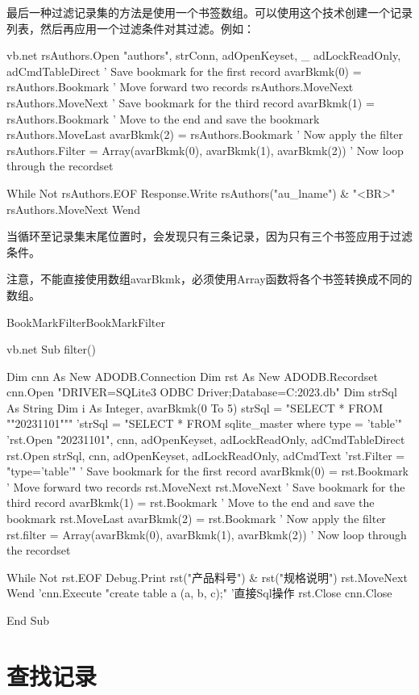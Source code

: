 最后一种过滤记录集的方法是使用一个书签数组。可以使用这个技术创建一个记录列表，然后再应用一个过滤条件对其过滤。例如：
\begin{amzcode}{vb.net}
rsAuthors.Open "authors", strConn, adOpenKeyset, _
                     adLockReadOnly, adCmdTableDirect
' Save bookmark for the first record
avarBkmk(0) = rsAuthors.Bookmark
' Move forward two records
rsAuthors.MoveNext
rsAuthors.MoveNext
' Save bookmark for the third record
avarBkmk(1) = rsAuthors.Bookmark
' Move to the end and save the bookmark
rsAuthors.MoveLast
avarBkmk(2) = rsAuthors.Bookmark
' Now apply the filter
rsAuthors.Filter = Array(avarBkmk(0), avarBkmk(1), avarBkmk(2))
' Now loop through the recordset

While Not rsAuthors.EOF
       Response.Write rsAuthors("au_lname") & "{\textless}BR{\textgreater}"
       rsAuthors.MoveNext
Wend
\end{amzcode}
当循环至记录集末尾位置时，会发现只有三条记录，因为只有三个书签应用于过滤条件。

注意，不能直接使用数组avarBkmk，必须使用Array函数将各个书签转换成不同的数组。
\begin{codebox}{BookMarkFilter}{BookMarkFilter}
	\begin{amzcode}{vb.net}
	Sub filter()
	
	Dim cnn As New ADODB.Connection
	Dim rst As New ADODB.Recordset
	cnn.Open "DRIVER={SQLite3 ODBC Driver};Database=C:\Users\Administrator\Desktop\tmp\fee2023.db"
	Dim strSql As String
	Dim i As Integer, avarBkmk(0 To 5)
	strSql = "SELECT * FROM ""20231101"""
	'strSql = "SELECT * FROM sqlite_master where type = 'table'"
	'rst.Open "20231101", cnn, adOpenKeyset, adLockReadOnly, adCmdTableDirect
	rst.Open strSql, cnn, adOpenKeyset, adLockReadOnly, adCmdText
	'rst.Filter = "type='table'"
	' Save bookmark for the first record
	avarBkmk(0) = rst.Bookmark
	' Move forward two records
	rst.MoveNext
	rst.MoveNext
	' Save bookmark for the third record
	avarBkmk(1) = rst.Bookmark
	' Move to the end and save the bookmark
	rst.MoveLast
	avarBkmk(2) = rst.Bookmark
	' Now apply the filter
	rst.filter = Array(avarBkmk(0), avarBkmk(1), avarBkmk(2))
	' Now loop through the recordset
	
	While Not rst.EOF
		Debug.Print rst("产品料号") & rst("规格说明")
		rst.MoveNext
	Wend
	'cnn.Execute "create table a (a, b, c);" '直接Sql操作
	rst.Close
	cnn.Close
	
	End Sub
	\end{amzcode}
\end{codebox}
\section{查找记录}

